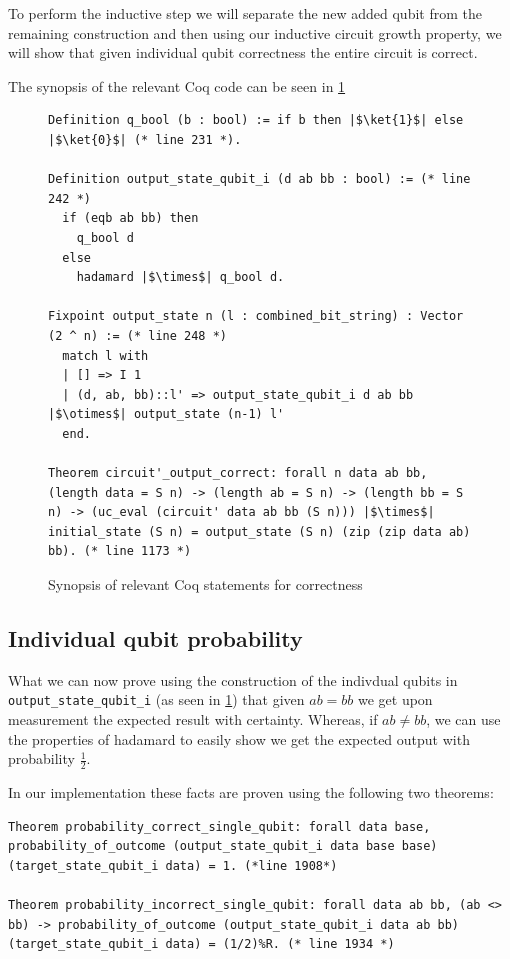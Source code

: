\documentclass{article}
\begin{document}
To perform the inductive step we will separate the new added qubit from the remaining construction and then using our inductive circuit growth property, we will show that given individual qubit correctness the entire circuit is correct.

The synopsis of the relevant Coq code can be seen in \cref{fig:correct-main-circuit}
\begin{figure}[h]
    \centering
\begin{verbatim}
Definition q_bool (b : bool) := if b then |$\ket{1}$| else |$\ket{0}$| (* line 231 *).

Definition output_state_qubit_i (d ab bb : bool) := (* line 242 *)
  if (eqb ab bb) then
    q_bool d
  else
    hadamard |$\times$| q_bool d.

Fixpoint output_state n (l : combined_bit_string) : Vector (2 ^ n) := (* line 248 *)
  match l with
  | [] => I 1
  | (d, ab, bb)::l' => output_state_qubit_i d ab bb |$\otimes$| output_state (n-1) l'
  end.
  
Theorem circuit'_output_correct: forall n data ab bb, (length data = S n) -> (length ab = S n) -> (length bb = S n) -> (uc_eval (circuit' data ab bb (S n))) |$\times$| initial_state (S n) = output_state (S n) (zip (zip data ab) bb). (* line 1173 *)
\end{verbatim}
    \caption{Synopsis of relevant Coq statements for correctness}
    \label{fig:correct-main-circuit}
\end{figure}

\subsection{Individual qubit probability}\label{sec:qubit-prob}

What we can now prove using the construction of the indivdual qubits in \texttt{output\_state\_qubit\_i} (as seen in \cref{fig:correct-main-circuit}) that given $ab=bb$ we get upon measurement the expected result with certainty.
Whereas, if $ab\neq bb$, we can use the properties of hadamard to easily show we get the expected output with probability $\frac{1}{2}$.

In our implementation these facts are proven using the following two theorems:
\begin{verbatim}
Theorem probability_correct_single_qubit: forall data base, probability_of_outcome (output_state_qubit_i data base base) (target_state_qubit_i data) = 1. (*line 1908*)

Theorem probability_incorrect_single_qubit: forall data ab bb, (ab <> bb) -> probability_of_outcome (output_state_qubit_i data ab bb) (target_state_qubit_i data) = (1/2)%R. (* line 1934 *)
\end{verbatim}
\end{document}
